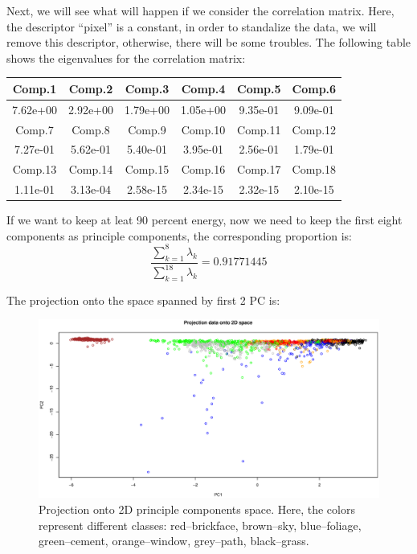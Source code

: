 \documentclass{article}
\begin{document}
Next, we will see what will happen if we consider the correlation matrix. Here, the descriptor ``pixel'' is a constant, in order to standalize
the data, we will remove this descriptor, otherwise, there will be some troubles. The following table shows the eigenvalues for the correlation
matrix:

 \begin{tabular}{|c|c|c|c|c|c|}
  \hline
  Comp.1 & Comp.2 & Comp.3 & Comp.4 & Comp.5 & Comp.6 \\ \hline
  7.62e+00 & 2.92e+00 & 1.79e+00 & 1.05e+00 & 9.35e-01 & 9.09e-01 \\ \hline
  Comp.7 & Comp.8 & Comp.9 & Comp.10 & Comp.11 & Comp.12 \\ \hline
  7.27e-01 & 5.62e-01 & 5.40e-01 & 3.95e-01 & 2.56e-01 & 1.79e-01 \\ \hline
  Comp.13 & Comp.14 & Comp.15 & Comp.16 & Comp.17 & Comp.18 \\ \hline
  1.11e-01 & 3.13e-04 & 2.58e-15 & 2.34e-15 & 2.32e-15 & 2.10e-15 \\ \hline
 \end{tabular}
 
If we want to keep at leat 90 percent energy, now we need to keep the first eight components as principle components, the corresponding 
proportion is:
\begin{equation}
 \frac{\sum_{k=1}^{8}\lambda_{k}}{\sum_{k=1}^{18}\lambda_{k}} = 0.91771445
\end{equation}

The projection onto the space spanned by first 2 PC is:

\begin{figure}[htp]
\centering
\includegraphics[width=12.1cm]{small_pca_projection_2D_2.eps}
\caption{Projection onto 2D principle components space. Here, the colors represent different classes: red--brickface, brown--sky, blue--foliage,
green--cement, orange--window, grey--path, black--grass.}
\end{figure}
\end{document}
